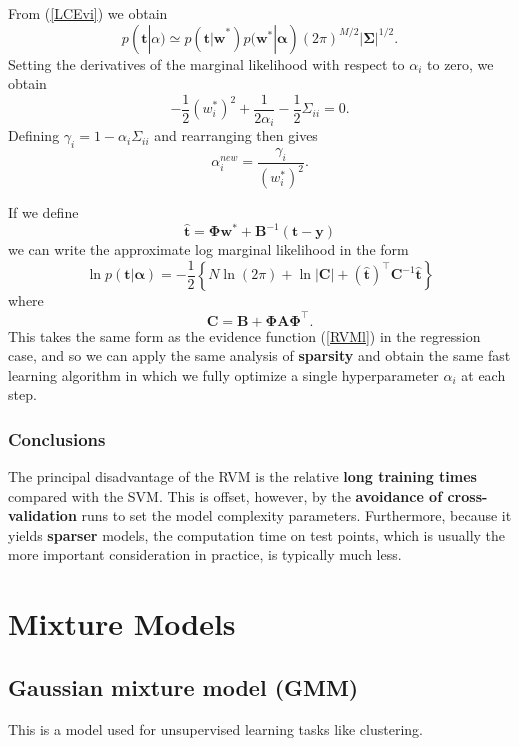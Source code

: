 \documentclass[a4paper]{report}
\renewcommand{\bf}{\mathbf}
\newcommand{\bs}{\boldsymbol}
\begin{document}
From (\ref{LCEvi}) we obtain
\begin{equation}
	p(\bf{t}|\alpha) \simeq p(\bf{t|w}^*)p(\bf{w}^*|\bs{\alpha})(2\pi)^{M/2}|\bs{\Sigma}|^{1/2}.
\end{equation}
Setting the derivatives of the marginal likelihood with respect to $\alpha_i$ to zero, we obtain
\begin{equation}
	-\frac{1}{2}(w_i^*)^2 + \frac{1}{2\alpha_i}-\frac{1}{2}\Sigma_{ii} = 0.
\end{equation}
Defining $\gamma_i = 1-\alpha_i \Sigma_{ii}$ and rearranging then gives
\begin{equation}
	\alpha_i^{new} = \frac{\gamma_i}{(w_i^*)^2}.
\end{equation}

If we define
\begin{equation}
	\hat{\bf{t}} = \bs{\Phi} \bf{w}^* + \bf{B}^{-1}(\bf{t-y})
\end{equation}
we can write the approximate log marginal likelihood in the form
\begin{equation}
	\ln p(\bf{t}|\bs{\alpha}) = -\frac{1}{2}\left\{ N \ln(2\pi) + \ln |\bf{C}| + (\hat{\bf{t}})^{\intercal} \bf{C}^{-1} \hat{\bf{t}} \right\}
\end{equation}
where
\begin{equation}
	\bf{C=B}+\bs{\Phi}\bf{A}\bs{\Phi}^{\intercal}.
\end{equation}
This takes the same form as the evidence function (\ref{RVMl}) in the regression case, and so we can apply the same analysis of \textbf{sparsity} and obtain the same fast learning algorithm in which we fully optimize a single hyperparameter $\alpha_i$ at each step.
\subsubsection{Conclusions}
The principal disadvantage of the RVM is the relative \textbf{long training times} compared with the SVM. This is offset, however, by the \textbf{avoidance of cross-validation} runs to set the model complexity parameters. Furthermore, because it yields \textbf{sparser} models, the computation time on test points, which is usually the more important consideration in practice, is typically much less.

\section{Mixture Models}
\subsection{Gaussian mixture model (GMM)}
This is a model used for unsupervised learning tasks like clustering.
\end{document}
